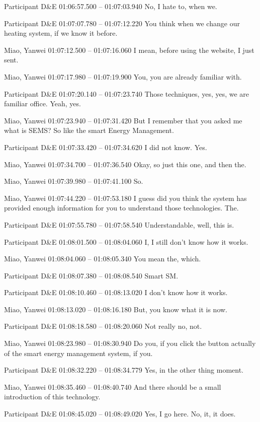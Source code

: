 {Participant D\&E 01:06:57.500 -- 01:07:03.940
No, I hate to, when we.

Participant D\&E 01:07:07.780 -- 01:07:12.220
You think when we change our heating system, if we know it before.

Miao, Yanwei 01:07:12.500 -- 01:07:16.060
I mean, before using the website, I just sent.

Miao, Yanwei 01:07:17.980 -- 01:07:19.900
You, you are already familiar with.

Participant D\&E 01:07:20.140 -- 01:07:23.740
Those techniques, yes, yes, we are familiar office. Yeah, yes.

Miao, Yanwei 01:07:23.940 -- 01:07:31.420
But I remember that you asked me what is SEMS? So like the smart Energy Management.

Participant D\&E 01:07:33.420 -- 01:07:34.620
I did not know. Yes.

Miao, Yanwei 01:07:34.700 -- 01:07:36.540
Okay, so just this one, and then the.

Miao, Yanwei 01:07:39.980 -- 01:07:41.100
So.

Miao, Yanwei 01:07:44.220 -- 01:07:53.180
I guess did you think the system has provided enough information for you to understand those technologies. The.

Participant D\&E 01:07:55.780 -- 01:07:58.540
Understandable, well, this is.

Participant D\&E 01:08:01.500 -- 01:08:04.060
I, I still don't know how it works.

Miao, Yanwei 01:08:04.060 -- 01:08:05.340
You mean the, which.

Participant D\&E 01:08:07.380 -- 01:08:08.540
Smart SM.

Participant D\&E 01:08:10.460 -- 01:08:13.020
I don't know how it works.

Miao, Yanwei 01:08:13.020 -- 01:08:16.180
But, you know what it is now.

Participant D\&E 01:08:18.580 -- 01:08:20.060
Not really no, not.

Miao, Yanwei 01:08:23.980 -- 01:08:30.940
Do you, if you click the button actually of the smart energy management system, if you.

Participant D\&E 01:08:32.220 -- 01:08:34.779
Yes, in the other thing moment.

Miao, Yanwei 01:08:35.460 -- 01:08:40.740
And there should be a small introduction of this technology.

Participant D\&E 01:08:45.020 -- 01:08:49.020
Yes, I go here. No, it, it does.

}
